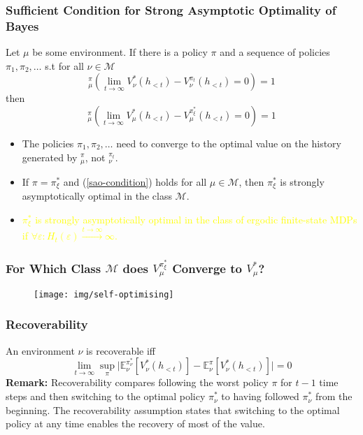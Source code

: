 \documentclass[UTF8,11pt,colorlinks,compress,openany]{beamer}%
\begin{document}
\begin{frame}\frametitle{\small Sufficient Condition for Strong Asymptotic Optimality of Bayes}\vspace{-1ex}
	\begin{theorem}
		Let $\mu$ be some environment. If there is a policy $\pi$ and a sequence of policies $\pi_1,\pi_2,\dots$ s.t for all $\nu\in\mathcal{M}$
		\begin{equation}
		{}_\mu^\pi\left(\lim\limits_{t\to\infty} V_\nu^*(h_{<t})-V_\nu^{\pi_t}(h_{<t})=0\right)=1\label{sao-condition}
		\end{equation}
		then
		\[{}_\mu^\pi\left(\lim\limits_{t\to\infty} V_\mu^*(h_{<t})-V_\mu^{\pi_\xi^*}(h_{<t})=0\right)=1\]
	\end{theorem}\vspace{-1ex}
	\begin{itemize}
		\item The policies $\pi_1,\pi_2,\dots$ need to converge to the optimal value on the history generated by ${}_\mu^\pi$, not ${}_\nu^{\pi_t}$.
		\item If $\pi=\pi_\xi^*$ and (\ref{sao-condition}) holds for all $\mu\in\mathcal{M}$, then $\pi_\xi^*$ is strongly asymptotically optimal in the class $\mathcal{M}$.
		\item \textcolor{yellow}{$\pi_\xi^*$ is strongly asymptotically optimal in the class of ergodic finite-state MDPs if $\forall \varepsilon: H_t(\varepsilon)\xrightarrow{t\to\infty}\infty$.}
	\end{itemize}
\end{frame}

\begin{frame}\frametitle{For Which Class $\mathcal{M}$ does $V_\mu^{\pi_\xi^*}$ Converge to $V_\mu^*$?}
	\begin{figure}
	\texttt{[image: img/self-optimising]}
	\end{figure}
\end{frame}

\begin{frame}\frametitle{Recoverability}
	An environment $\nu$ is recoverable iff
	\[\lim\limits_{t\to\infty}\sup\limits_\pi\Big|\mathbb{E}_\nu^{\pi_\nu^*}\left[V_\nu^*(h_{<t})\right]-\mathbb{E}_\nu^\pi\left[V_\nu^*(h_{<t})\right]\Big|=0\]
	\textbf{Remark:} Recoverability compares following the worst policy $\pi$ for $t-1$ time steps and then
	switching to the optimal policy $\pi_\nu^*$ to having followed $\pi_\nu^*$ from the beginning. The recoverability assumption states that switching to the optimal policy at any time enables the recovery of most of the value.
\end{frame}
\end{document}
